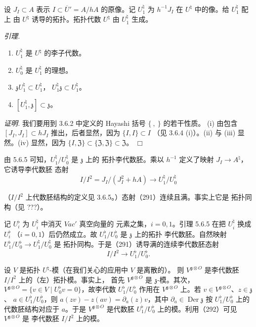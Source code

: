  设 $J_I\subset A$ 表示 $I\subset\overline{U}'=A/hA$ 的原像。记
$U^{\natural}_1$ 为 $h^{-1}J_I$ 在 $U^{\natural}$ 中的像。给 $U^{\natural}_1$ 配上
由 $U^{\natural}$ 诱导的拓扑。拓扑代数 $U^{\natural}$ 由 $U^{\natural}_1$ 生成。

 \emph{引理.}
\begin{enumerate}[label=(\roman*),leftmargin=2.2em]
\item $U^{\natural}_1$ 是 $U^{\natural}$ 的李子代数。
\item $U^{\natural}_0$ 是 $U^{\natural}_1$ 的理想。
\item $\mathfrak{z}U^{\natural}_1\subset U^{\natural}_1$，
$U^{\natural}_1\mathfrak{z}\subset U^{\natural}_1$。
\item $[U^{\natural}_1,\mathfrak{z}]\subset\mathfrak{z}$。
\end{enumerate}

\emph{证明.} 我们要用到 3.6.2 中定义的 Hayashi 括号 $\{\ ,\ \}$ 的若干性质。
(i) 由包含 $[J_I,J_I]\subset hJ_I$ 推出，后者显然，因为 $\{I,I\}\subset I$
（见 3.6.4 (i)）。(ii) 与 (iii) 显然。(iv) 显然，因为
$\{I,\mathfrak{Z}\}\subset\{\mathfrak{Z},\mathfrak{Z}\}\subset\mathfrak{Z}$。
\hfill$\Box$

 由 5.6.5 可知，$U^{\natural}_1/U^{\natural}_0$ 是 $\mathfrak{z}$ 上的
拓扑李代数胚。乘以 $h^{-1}$ 定义了映射 $J_I\to A^{\natural}$，它诱导李代数胚
态射
\begin{equation}\tag{291}
I/I^{2}=J_I/(J_I^{2}+hA)\to U^{\natural}_1/U^{\natural}_0
\end{equation}


（$I/I^{2}$ 上代数胚结构的定义见 3.6.5。）态射（291）连续且满。事实上它是
拓扑同构（见 ???）。

 记 $U^{\flat}_i$ 为 $U^{\natural}_i$ 中消灭 $\mathit{Vac}'$ 真空向量的
元素之集，$i=0,1$。引理 5.6.5 在把 $U^{\natural}_i$ 换成 $U^{\flat}_i$
（$i=0,1$）后仍然成立。故 $U^{\flat}_1/U^{\flat}_0$ 是 $\mathfrak{z}$ 上的拓扑
李代数胚。自然映射 $U^{\flat}_1/U^{\flat}_0\to U^{\natural}_1/U^{\natural}_0$ 是
拓扑同构。于是（291）诱导满的连续李代数胚态射
\begin{equation}\tag{292}
I/I^{2}\to U^{\flat}_1/U^{\flat}_0.
\end{equation}

 设 $V$ 是拓扑 $U^{\natural}$-模（在我们关心的应用中 $V$ 是离散的）。
则 $V^{\mathfrak{g}\otimes O}$ 是李代数胚 $I/I^{2}$ 上的（左）拓扑模。事实上，
首先 $V^{\mathfrak{g}\otimes O}$ 是 $\mathfrak{z}$-模。其次，
$V^{\mathfrak{g}\otimes O}=\{v\in V\mid U^{\flat}_0v=0\}$，故李代数
$U^{\flat}_1/U^{\flat}_0$ 作用在 $V^{\mathfrak{g}\otimes O}$ 上。若
$v\in V^{\mathfrak{g}\otimes O}$、$z\in\mathfrak{z}$、
$a\in U^{\flat}_1/U^{\flat}_0$，则 $a(zv)-z(av)=\partial_a(z)v$，其中
$\partial_a\in\operatorname{Der}\mathfrak{z}$ 按 $U^{\flat}_1/U^{\flat}_0$ 上的
代数胚结构对应于 $a$。于是 $V^{\mathfrak{g}\otimes O}$ 是代数胚
$U^{\flat}_1/U^{\flat}_0$ 上的模。利用（292）可见 $V^{\mathfrak{g}\otimes O}$ 是
李代数胚 $I/I^{2}$ 上的模。

